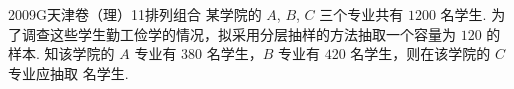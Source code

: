 
\begin{problem}{2009}{G}{天津卷（理）}{11}{排列组合}
某学院的 $A$, $B$, $C$ 三个专业共有 $1200$ 名学生. 为了调查这些学生勤工俭学的情况，拟采用分层抽样的方法抽取一个容量为 $120$ 的样本. 知该学院的 $A$ 专业有 $380$ 名学生，$B$ 专业有 $420$ 名学生，则在该学院的 $C$ 专业应抽取 \underline{\hspace{4em}} 名学生.
\end{problem}

\begin{answer}

\end{answer}

\begin{solutions}

\end{solutions}